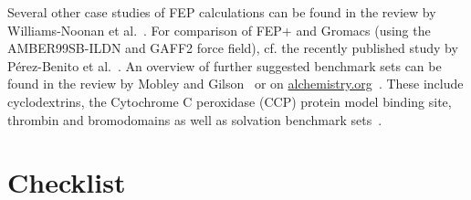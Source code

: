 \documentclass[9pt,bestpractices]{livecoms}
\begin{document}
Several other case studies of FEP calculations can be found in the review by Williams-Noonan et al.~\cite{williams-noonan2018free}. For comparison of FEP+ and Gromacs (using the AMBER99SB-ILDN and GAFF2 force field), cf. the recently published study by Pérez-Benito et al.~\cite{perez-benito2019predicting}.
An overview of further suggested benchmark sets can be found in the review by Mobley and Gilson~\cite{mobley2017predicting} or on \url{alchemistry.org}~\cite{alchemistry}. These include cyclodextrins, the Cytochrome C peroxidase (CCP) protein model binding site, thrombin and bromodomains as well as solvation benchmark sets~\cite{paliwal2011benchmark}. 

\section{Checklist}
\label{sec:checklist}


\end{document}
